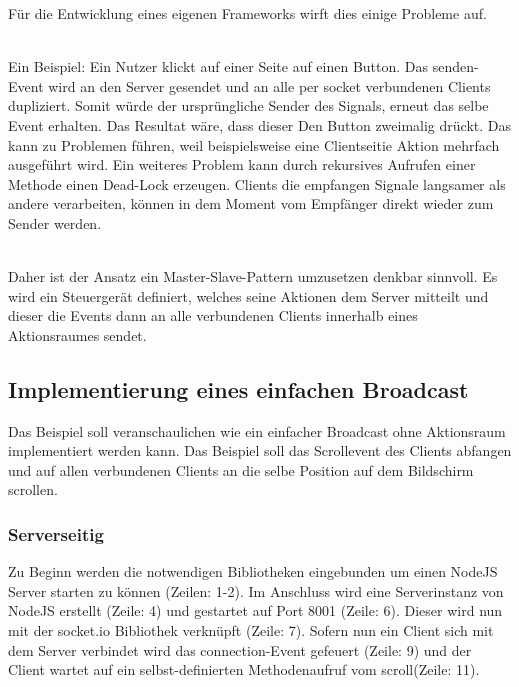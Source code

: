 Für die Entwicklung eines eigenen Frameworks wirft dies einige Probleme auf.

\\ Ein  Beispiel: Ein Nutzer klickt auf einer Seite auf einen Button. Das senden-Event wird an den Server gesendet und an alle per socket verbundenen Clients dupliziert. Somit würde der ursprüngliche Sender des Signals, erneut das selbe Event erhalten. Das Resultat wäre, dass dieser Den Button zweimalig drückt. Das kann zu Problemen führen, weil beispielsweise eine Clientseitie Aktion mehrfach ausgeführt wird. Ein weiteres Problem kann durch rekursives Aufrufen einer Methode einen Dead-Lock erzeugen. Clients die empfangen Signale langsamer als andere verarbeiten, können in dem Moment vom Empfänger direkt wieder zum Sender werden.
	
	\\Daher ist der Ansatz ein Master-Slave-Pattern umzusetzen denkbar sinnvoll. Es wird ein Steuergerät definiert, welches seine Aktionen dem Server mitteilt und dieser die Events dann an alle verbundenen Clients innerhalb eines Aktionsraumes sendet.
	
	
	\subsection{Implementierung eines einfachen Broadcast}
	Das Beispiel soll veranschaulichen wie ein einfacher Broadcast ohne Aktionsraum implementiert werden kann. Das Beispiel soll das Scrollevent des Clients abfangen und auf allen verbundenen Clients an die selbe Position auf dem Bildschirm scrollen.
	
	\subsubsection{Serverseitig}
	Zu Beginn werden die notwendigen Bibliotheken eingebunden um einen NodeJS Server starten zu können (Zeilen: 1-2). Im Anschluss wird  eine Serverinstanz von NodeJS erstellt (Zeile: 4) und gestartet auf Port 8001 (Zeile: 6). Dieser wird nun mit der socket.io Bibliothek verknüpft (Zeile: 7). Sofern nun ein Client sich mit dem Server verbindet wird das \frqq connection\flqq-Event gefeuert (Zeile: 9) und der Client wartet auf ein selbst-definierten Methodenaufruf vom  \frqq scroll\flqq (Zeile: 11).
	
